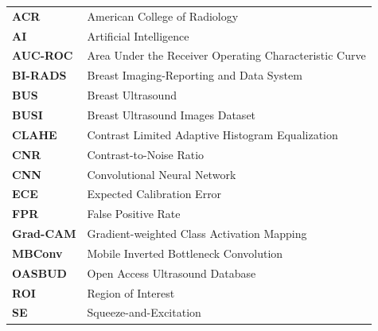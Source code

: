 \begin{table}[H]
\small
\begin{tabular}{@{}ll@{}}
\textbf{ACR} & American College of Radiology \\
\textbf{AI} & Artificial Intelligence \\
\textbf{AUC-ROC} & Area Under the Receiver Operating Characteristic Curve \\
\textbf{BI-RADS} & Breast Imaging-Reporting and Data System \\
\textbf{BUS} & Breast Ultrasound \\
\textbf{BUSI} & Breast Ultrasound Images Dataset \\
\textbf{CLAHE} & Contrast Limited Adaptive Histogram Equalization \\
\textbf{CNR} & Contrast-to-Noise Ratio \\
\textbf{CNN} & Convolutional Neural Network \\
\textbf{ECE} & Expected Calibration Error \\
\textbf{FPR} & False Positive Rate \\
\textbf{Grad-CAM} & Gradient-weighted Class Activation Mapping \\
\textbf{MBConv} & Mobile Inverted Bottleneck Convolution \\
\textbf{OASBUD} & Open Access Ultrasound Database \\
\textbf{ROI} & Region of Interest \\
\textbf{SE} & Squeeze-and-Excitation \\
\end{tabular}
\end{table}

